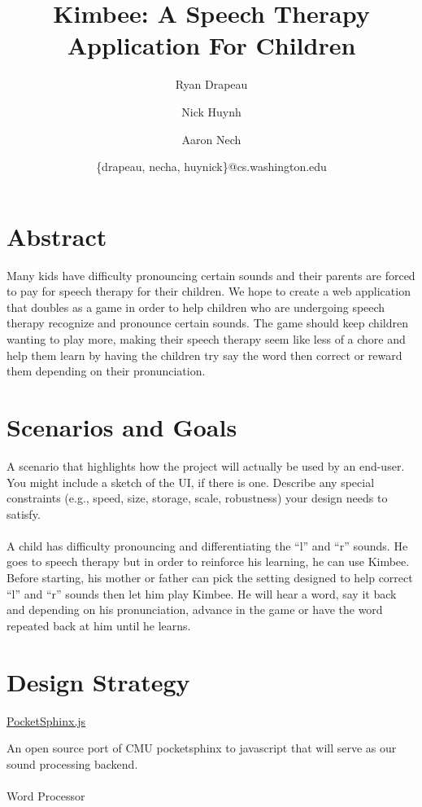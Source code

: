 \documentclass{article}
\begin{document}
\title{Kimbee: A Speech Therapy Application For Children}
\author{Ryan Drapeau \and Nick Huynh \and Aaron Nech}
\date{\{drapeau, necha, huynick\}@cs.washington.edu}

\maketitle

\section{Abstract}

Many kids have difficulty pronouncing certain sounds and their parents are forced to pay for speech therapy for their children. We hope to create a web application that doubles as a game in order to help children who are undergoing speech therapy recognize and pronounce certain sounds. The game should keep children wanting to play more, making their speech therapy seem like less of a chore and help them learn by having the children try say the word then correct or reward them depending on their pronunciation.

\section{Scenarios and Goals}

A scenario that highlights how the project will actually be used by an end-user. You might include a sketch of the UI, if there is one. Describe any special constraints (e.g., speed, size, storage, scale, robustness) your design needs to satisfy.\\\\
A child has difficulty pronouncing and differentiating the ``l'' and ``r'' sounds. He goes to speech therapy but in order to reinforce his learning, he can use Kimbee. Before starting, his mother or father can pick the setting designed to help correct ``l'' and ``r'' sounds then let him play Kimbee. He will hear a word, say it back and depending on his pronunciation, advance in the game or have the word repeated back at him until he learns.

\section{Design Strategy}

\href{http://syl22-00.github.io/pocketsphinx.js/}{PocketSphinx.js}

An open source port of CMU pocketsphinx to javascript that will serve as our sound processing backend.\\\\
Word Processor
\end{document}
